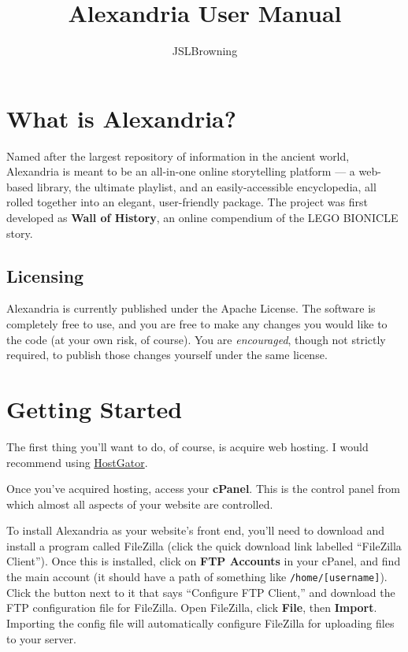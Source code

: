 \documentclass[11pt]{article} %
\title{Alexandria User Manual}
\author{JSLBrowning}
\begin{document}
\maketitle

\section{What is Alexandria?}

Named after the largest repository of information in the ancient world, Alexandria is meant to be an all-in-one online storytelling platform — a web-based library, the ultimate playlist, and an easily-accessible encyclopedia, all rolled together into an elegant, user-friendly package. The project was first developed as \textbf{Wall of History}, an online compendium of the LEGO BIONICLE story.

\subsection{Licensing}

Alexandria is currently published under the Apache License. The software is completely free to use, and you are free to make any changes you would like to the code (at your own risk, of course). You are \textit{encouraged}, though not strictly required, to publish those changes yourself under the same license.

\section{Getting Started}

The first thing you’ll want to do, of course, is acquire web hosting. I would recommend using \href{https://www.hostgator.com/}{HostGator}.

Once you’ve acquired hosting, access your \textbf{cPanel}. This is the control panel from which almost all aspects of your website are controlled.

To install Alexandria as your website’s front end, you’ll need to download and install a program called FileZilla (click the quick download link labelled “FileZilla Client”). Once this is installed, click on \textbf{FTP Accounts} in your cPanel, and find the main account (it should have a path of something like \texttt{/home/[username]}). Click the button next to it that says “Configure FTP Client,” and download the FTP configuration file for FileZilla. Open FileZilla, click \textbf{File}, then \textbf{Import}. Importing the config file will automatically configure FileZilla for uploading files to your server.
\end{document}
